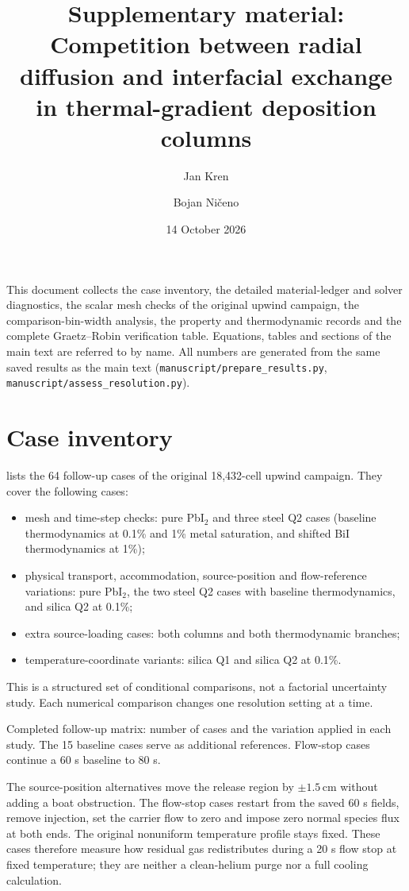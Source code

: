 \documentclass{article}
\title{Supplementary material: Competition between radial diffusion and
interfacial exchange in thermal-gradient deposition columns}
\author[1]{Jan Kren}
\author[1]{Bojan Ni\v{c}eno}
\affil[1]{Paul Scherrer Institute, 5232 Villigen PSI, Switzerland}
\date{14 October 2026}
\newcommand{\units}[1]{\,\mathrm{#1}}
\begin{document}
\raggedbottom
\maketitle
\noindent This document collects the case inventory, the detailed
material-ledger and solver diagnostics, the scalar mesh checks of the
original upwind campaign, the comparison-bin-width analysis, the
property and thermodynamic records and the complete Graetz--Robin
verification table. Equations, tables and sections of the main text are
referred to by name. All numbers are generated from the same saved
results as the main text (\texttt{manuscript/prepare\_results.py},
\texttt{manuscript/assess\_resolution.py}).

\section{Case inventory}
\label{sec:s-cases}
 lists the 64 follow-up cases of the original
18,432-cell upwind campaign. They cover the following cases:
\begin{itemize}
\item mesh and time-step checks: pure PbI$_2$ and three steel Q2 cases
  (baseline thermodynamics at 0.1\% and 1\% metal saturation, and
  shifted BiI thermodynamics at 1\%);
\item physical transport, accommodation, source-position and
  flow-reference variations: pure PbI$_2$, the two steel Q2 cases with
  baseline thermodynamics, and silica Q2 at 0.1\%;
\item extra source-loading cases: both columns and both thermodynamic
  branches;
\item temperature-coordinate variants: silica Q1 and silica Q2 at
  0.1\%.
\end{itemize}
This is a structured set of conditional comparisons, not a factorial
uncertainty study. Each numerical comparison changes one resolution
setting at a time.
\begin{table}[htbp]
\centering
\caption{Completed follow-up matrix: number of cases and the variation
applied in each study. The 15 baseline cases serve as additional
references. Flow-stop cases continue a 60 s baseline to 80 s.}
\label{tab:study}
\small
\end{table}

The source-position alternatives move the release region by
$\pm1.5\units{cm}$ without adding a boat obstruction. The flow-stop
cases restart from the saved 60 s fields, remove injection, set the
carrier flow to zero and impose zero normal species flux at both ends.
The original nonuniform temperature profile stays fixed. These cases
therefore measure how residual gas redistributes during a 20 s flow
stop at fixed temperature; they are neither a clean-helium purge nor a
full cooling calculation.
\end{document}
